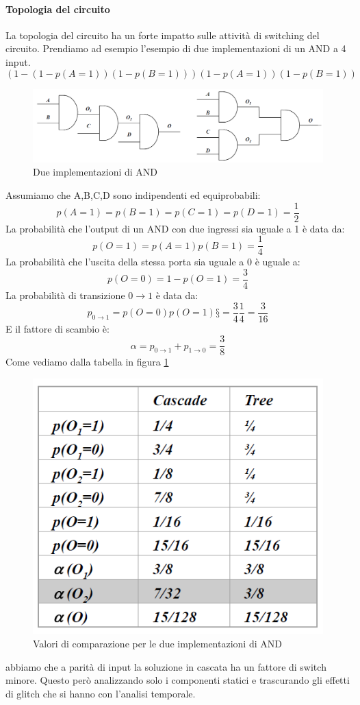 \paragraph{Topologia del circuito} La topologia del circuito ha un forte impatto sulle attività di switching del circuito. Prendiamo ad esempio l'esempio di due implementazioni di un AND a 4 input. 
$$(1-(1-p(A = 1))(1-p(B = 1)))(1-p(A = 1))(1 - p(B = 1))$$
\begin{figure}[hbt]
\centering
\includegraphics[scale=0.4]{img/and4input.png}
\caption{Due implementazioni di AND}
\end{figure}
Assumiamo che A,B,C,D sono indipendenti ed equiprobabili:
$$p(A = 1) = p(B = 1) = p(C = 1) = p(D = 1) = \frac{1}{2}$$
La probabilità che l'output di un AND con due ingressi sia uguale a 1 è data da:
$$p(O = 1) = p(A = 1)p(B = 1) = \frac{1}{4}$$
La probabilità che l'uscita della stessa porta sia uguale a 0 è uguale a:
$$p(O = 0) = 1-p(O = 1) = \frac{3}{4}$$
La probabilità di transizione $0 \rightarrow 1$ è data da:
$$p_{0\rightarrow 1}= p(O=0)p(O=1)§=\frac{3}{4}\frac{1}{4}=\frac{3}{16}$$
E il fattore di scambio è:
$$\alpha = p_{0\rightarrow 1} + p_{1\rightarrow 0} = \frac{3}{8}$$
Come vediamo dalla tabella in figura \ref{fig:2ANDimp}
\begin{figure}[hbt]
\centering
\includegraphics[scale=0.5]{img/2ANDimp.png}
\caption{Valori di comparazione per le due implementazioni di AND}\label{fig:2ANDimp}
\end{figure}
abbiamo che a parità di input la soluzione in cascata ha un fattore di switch minore.
Questo però analizzando solo i componenti statici e trascurando gli effetti di glitch che si hanno con l'analisi temporale.
